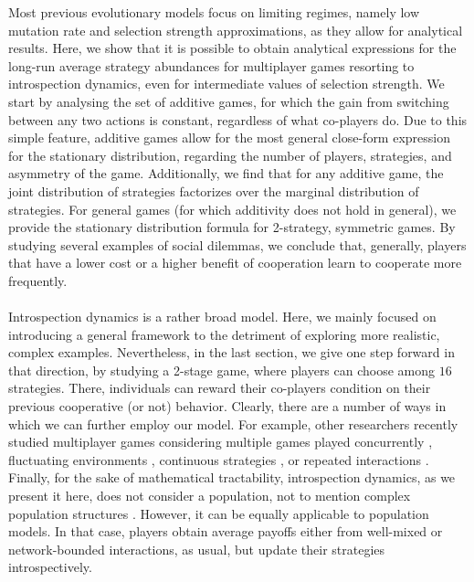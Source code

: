 \documentclass[11pt]{article}
\theoremstyle{plainCl1}
\theoremstyle{plainCl2}
\begin{document}
Most previous evolutionary models focus on limiting regimes, namely low mutation rate and selection strength approximations, as they allow for analytical results. 
Here, we show that it is possible to obtain analytical expressions for the long-run average strategy abundances for multiplayer games resorting to introspection dynamics, even for intermediate values of selection strength.  
We start by analysing the set of additive games, for which the gain from switching between any two actions is constant, regardless of what co-players do. 
Due to this simple feature, additive games allow for the most general close-form expression for the stationary distribution, regarding the number of players, strategies, and asymmetry of the game. 
Additionally, we find that for any additive game, the joint distribution of strategies factorizes over the marginal distribution of strategies. 
For general games (for which additivity does not hold in general), we provide the stationary distribution formula for 2-strategy, symmetric games.
By studying several examples of social dilemmas, we conclude that, generally, players that have a lower cost or a higher benefit of cooperation learn to cooperate more frequently. \\ \\ 
\noindent Introspection dynamics is a rather broad model. Here, we mainly focused on introducing a general framework to the detriment of exploring more realistic, complex examples. Nevertheless, in the last section, we give one step forward in that direction, by studying a 2-stage game, where players can choose among $16$ strategies. There, individuals can reward their co-players condition on their previous cooperative (or not) behavior.
\noindent Clearly, there are a number of ways in which we can further employ our model. For example, other researchers recently studied multiplayer games considering multiple games played concurrently \cite{Venkateswaran:PRSB:2019}, fluctuating environments \cite{Baron:JRSOP:2018}, continuous strategies \cite{Molina:JMB:2017}, or repeated interactions \cite{Hilbe:JTB:2015}.
Finally, for the sake of mathematical tractability, introspection dynamics, as we present it here, does not consider a population, not to mention complex population structures \cite{Broom:JTB:2012, Wu:Games:2013, Perc:JRSI:2013, Pena:JTB:2015, Pena:JRSI:2016, Pattni:JTB:2017, Su:PNAS:2022}. However, it can be equally applicable to population models. In that case, players obtain average payoffs either from well-mixed or network-bounded interactions, as usual, but update their strategies introspectively.
\end{document}
